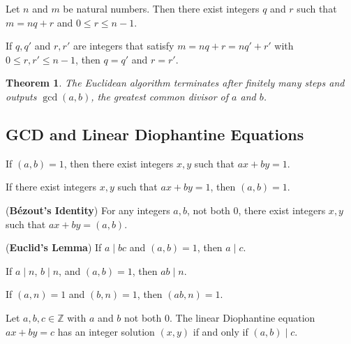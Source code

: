 \documentclass{article}
\newtheorem*{theorem*}{Theorem}
\theoremstyle{definition}
\newenvironment{manualtheorem}[1]{%
  \renewcommand{\thetheorem}{#1}%
  \theorem%
}{%
  \endtheorem%
}
\begin{document}
\begin{manualtheorem}{1.26}
	Let $n$ and $m$ be natural numbers. Then there exist integers $q$ and $r$ such that $m = nq + r$ and $0 \leq r \leq n - 1$.
\end{manualtheorem}

\begin{manualtheorem}{1.27}
	If $q, q'$ and $r, r'$ are integers that satisfy $m = nq + r = nq' + r'$ with $0 \leq r, r' \leq n - 1$, then $q = q'$ and $r = r'$.
\end{manualtheorem}

\begin{theorem*}
	The Euclidean algorithm terminates after finitely many steps and outputs $\gcd(a, b)$, the greatest common divisor of $a$ and $b$.
\end{theorem*}

\subsection{GCD and Linear Diophantine Equations}

\begin{manualtheorem}{1.38}
	If $(a,b)=1$, then there exist integers $x,y$ such that $ax+by=1$.
\end{manualtheorem}

\begin{manualtheorem}{1.39}
	If there exist integers $x,y$ such that $ax+by=1$, then $(a,b)=1$.
\end{manualtheorem}

\begin{manualtheorem}{1.40}
	(\textbf{B\'ezout's Identity}) For any integers $a,b$, not both $0$, there exist integers $x,y$ such that $ax+by=(a,b)$.
\end{manualtheorem}

\begin{manualtheorem}{1.41}
	(\textbf{Euclid's Lemma}) If $a \mid bc$ and $(a,b)=1$, then $a \mid c$.
\end{manualtheorem}

\begin{manualtheorem}{1.42}
	If $a \mid n$, $b \mid n$, and $(a,b)=1$, then $ab \mid n$.
\end{manualtheorem}

\begin{manualtheorem}{1.43}
	If $(a,n)=1$ and $(b,n)=1$, then $(ab,n)=1$.
\end{manualtheorem}

\begin{manualtheorem}{1.48}
	Let $a,b,c \in \mathbb{Z}$ with $a$ and $b$ not both $0$. The linear Diophantine equation $ax+by=c$ has an integer solution $(x,y)$ if and only if $(a,b)\mid c$.
\end{manualtheorem}
\end{document}
